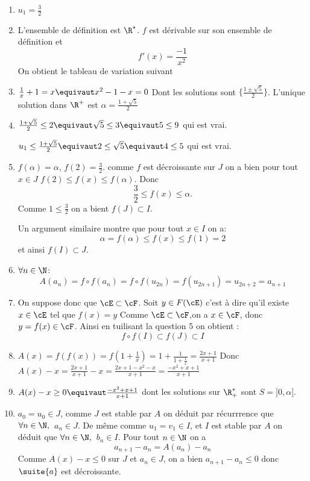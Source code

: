 \begin{correction}
\begin{enumerate}
\item $u_1=\frac{3}{2}$
\item L'ensemble de définition est $\R^*$.  $f$ est dérivable sur son ensemble de définition et 
$$f'(x) =\frac{-1}{x^2}$$
On obtient le tableau de variation suivant 




\item $\frac{1}{x}+1=x\equivaut x^2-1-x=0$
Dont les solutions sont $\{ \frac{1\pm\sqrt{5}}{2}\}$. L'unique solution dans $\R^+$ est $\alpha = \frac{1+\sqrt{5}}{2}$

\item $\frac{1+\sqrt{5}}{2}\leq 2 \equivaut \sqrt{5}\leq 3 \equivaut 5\leq 9$ qui est vrai. 

$u_1 \leq \frac{1+\sqrt{5}}{2} \equivaut 2\leq \sqrt{5} \equivaut 4 \leq 5$ qui est vrai. 

\item $f(\alpha) =\alpha$, $f(2) =\frac{3}{2}$. comme $f$ est décroissante sur $J$ on a bien pour tout $x\in J$ 
$f(2)\leq f(x)\leq f(\alpha)$. Donc 
$$\frac{3}{2}\leq f(x) \leq \alpha.$$ 
Comme $1\leq \frac{3}{2}$ on  a bient $f(J)\subset I$. 

Un argument similaire montre que pour tout $x\in I$ on  a:
$$\alpha =f(\alpha) \leq f(x)\leq f(1)=2$$
et ainsi $f(I)\subset J$. 
\item $\forall n\in\N$:
$$A(a_n) = f\circ f(a_n)=f\circ f (u_{2n})= f(u_{2n+1}) = u_{2n+2}=a_{n+1}$$

\item On suppose donc que $\cE\subset \cF$. Soit $y\in F(\cE)$ c'est à dire qu'il existe $x\in \cE$ tel que $f(x)=y$
Comme $\cE\subset \cF$,on a $x\in \cF$, donc $y=f(x)\in \cF$. Ainsi en tuilisant la question 5 on obtient : 
$$f\circ f(I) \subset f(J) \subset I$$

\item $A(x)=f(f(x))=f(  1+\frac{1}{x}) =1 + \frac{1}{1+\frac{1}{x}}= \frac{2x+1}{x+1} $
Donc $A(x) - x = \frac{2x+1}{x+1}  -x = \frac{2x+1-x^2 -x}{x+1} = \frac{-x^2+x+1}{x+1}$ 
\item $A(x)-x\geq 0 \equivaut \frac{-x^2+x+1}{x+1}$ dont les solutions sur $\R_+^*$ sont $S= ]0,\alpha [$. 
\item $a_0 =u_0 \in J$, comme $J$ est stable par $A$ on déduit par récurrrence que $\forall n\in \N,\, $ $a_n\in J$.
De même comme $u_1=v_1 \in I$, et $I$  est stable par $A$ on déduit que $\forall n\in \N,\,$ $b_n\in I$.
Pour tout $n\in \N$ on  a 
$$a_{n+1}-a_n= A(a_n)-a_n$$
Comme $ A(x)-x\leq 0 $ sur $J$ et $a_n\in J$, on a bien $a_{n+1}-a_{n}\leq 0$ donc $\suite{a}$ est décroissante. 


\end{enumerate}
\end{correction}
